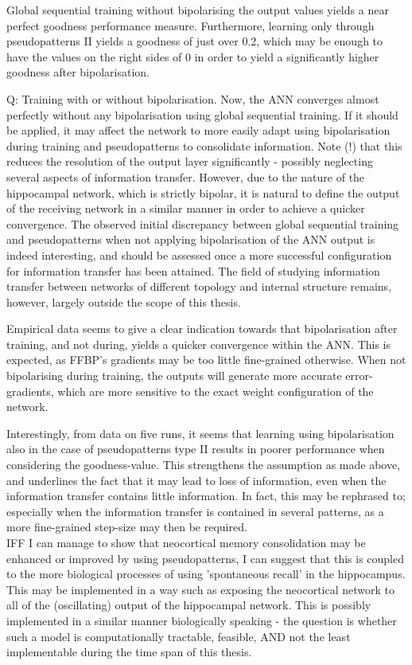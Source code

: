 Global sequential training without bipolarising the output values yields a near perfect goodness performance measure. Furthermore, learning only through pseudopatterns II yields a goodness of just over 0.2, which may be enough to have the values on the right sides of 0 in order to yield a significantly higher goodness after bipolarisation.

Q: Training with or without bipolarisation. Now, the ANN converges almost perfectly without any bipolarisation using global sequential training. If it should be applied, it may affect the network to more easily adapt using bipolarisation during training and pseudopatterns to consolidate information. Note (!) that this reduces the resolution of the output layer significantly - possibly neglecting several aspects of information transfer. However, due to the nature of the hippocampal network, which is strictly bipolar, it is natural to define the output of the receiving network in a similar manner in order to achieve a quicker convergence. The observed initial discrepancy between global sequential training and pseudopatterns when not applying bipolarisation of the ANN output is indeed interesting, and should be assessed once a more successful configuration for information transfer has been attained. The field of studying information transfer between networks of different topology and internal structure remains, however, largely outside the scope of this thesis.

Empirical data seems to give a clear indication towards that bipolarisation after training, and not during, yields a quicker convergence within the ANN. This is expected, as FFBP's gradients may be too little fine-grained otherwise. When not bipolarising during training, the outputs will generate more accurate error-gradients, which are more sensitive to the exact weight configuration of the network.

Interestingly, from data on five runs, it seems that learning using bipolarisation also in the case of pseudopatterns type II results in poorer performance when considering the goodness-value. This strengthens the assumption as made above, and underlines the fact that it may lead to loss of information, even when the information transfer contains little information. In fact, this may be rephrased to; especially when the information transfer is contained in several patterns, as a more fine-grained step-size may then be required.
\\

IFF I can manage to show that neocortical memory consolidation may be enhanced or improved by using pseudopatterns, I can suggest that this is coupled to the more biological processes of using 'spontaneous recall' in the hippocampus. This may be implemented in a way such as exposing the neocortical network to all of the (oscillating) output of the hippocampal network. This is possibly implemented in a similar manner biologically speaking - the question is whether such a model is computationally tractable, feasible, AND not the least implementable during the time span of this thesis.
\\


